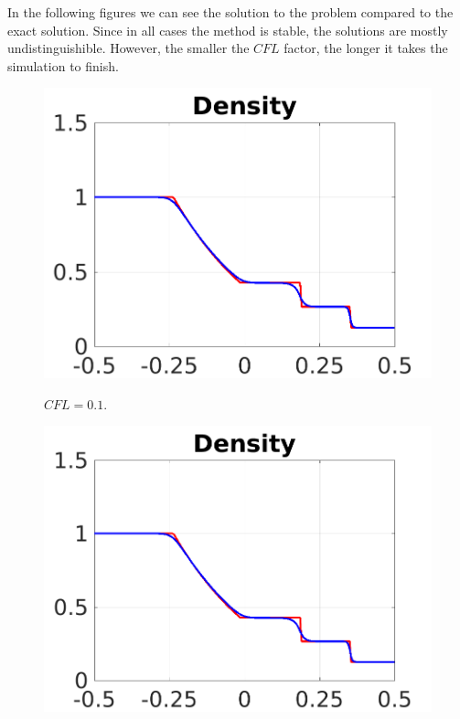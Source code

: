 \begin{questions}

\begin{solution}
In the following figures we can see the solution to the problem compared to the exact solution. Since in all cases the method is stable, the solutions are mostly undistinguishible. However, the smaller the $CFL$ factor, the longer it takes the simulation to finish.
\begin{figure}[H]
\centering     %
{\includegraphics[scale=0.5]{density_r01.png}}
\caption{$CFL= 0.1$.}
\end{figure}
\begin{figure}[H]
\centering     %
{\includegraphics[scale=0.5]{density_r05.png}}

\end{figure}
\end{solution}
\end{questions}
